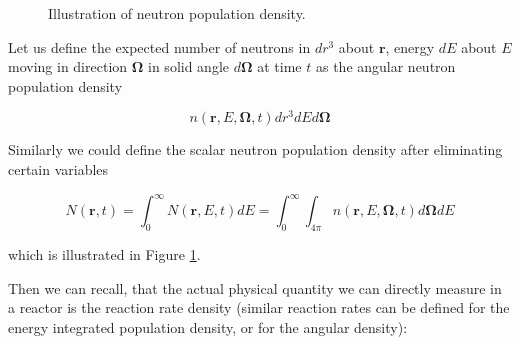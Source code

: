 \begin{figure}[ht!]
\protect {}\protect
\caption{\label{fig:neutronpopulation} \footnotesize{Illustration of neutron population density.}}
\end{figure} 

Let us define the expected number of neutrons in $dr^3$ about $\mathbf{r}$, energy $dE$ about $E$ moving in direction $\mathbf{\Omega}$ in solid angle $d\mathbf{\Omega}$ at time $t$ as the angular neutron population density

\begin{equation}
n(\mathbf{r},E,\mathbf{\Omega},t)dr^3dEd\mathbf{\Omega}
\end{equation}

\noindent Similarly we could define the scalar neutron population density after eliminating certain variables 

$$N(\mathbf{r},t)=\int^\infty_0N(\mathbf{r},E,t)dE=\int^\infty_0\int_{4\pi}n(\mathbf{r},E,\mathbf{\Omega},t)d\mathbf{\Omega}dE$$

\noindent which is illustrated in Figure \ref{fig:neutronpopulation}.

Then we can recall, that the actual physical quantity we can directly measure in a reactor is the reaction rate density (similar reaction rates can be defined for the energy integrated population density, or for the angular density):

